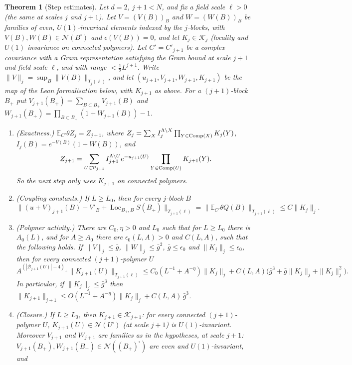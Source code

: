 \documentclass[11pt]{amsart}
\newtheorem{theorem}{Theorem}[section]
\theoremstyle{definition}
\theoremstyle{remark}
\numberwithin{equation}{section}
\newcommand{\E}{\mathbb{E}}
\newcommand{\cB}{\mathcal{B}}
\newcommand{\cP}{\mathcal{P}}
\newcommand{\cN}{\mathcal{N}}
\newcommand{\Loc}{\operatorname{Loc}}
\begin{document}
\begin{theorem}[Step estimates]\label{thm:step}
Let $d=2$, $j+1<N$, and fix a field scale $\ell>0$ (the same at scales $j$ and $j+1$). Let
$V=(V(B))_B$ and $W=(W(B))_B$ be families of even, $U(1)$-invariant elements indexed by the
$j$-blocks, with $V(B),W(B)\in\cN(B^\square)$ and $\epsilon(V(B))=0$, and let
$K_j\in\mathcal K_j$ (locality and $U(1)$ invariance on connected polymers). Let $C'=C'_{j+1}$
be a complex covariance with a Gram representation satisfying the Gram bound at scale $j+1$ and
field scale $\ell$, and with range $<\frac12L^{j+1}$. Write $\|V\|_j=\sup_B\|V(B)\|_{T_j(\ell)}$,
and let $(u_{j+1},V_{j+1},W_{j+1},K_{j+1})$ be the map of the Lean formalisation below, with
$K_{j+1}$ as above. For a $(j+1)$-block $B_+$ put
$V_{j+1}(B_+)=\sum_{B\subset B_+}V_{j+1}(B)$ and
$W_{j+1}(B_+)=\prod_{B\subset B_+}(1+W_{j+1}(B))-1$.
\begin{enumerate}
\item[(i)] (Exactness.) $\E_{C'}\theta Z_j=Z_{j+1}$, where
  $Z_j=\sum_XI_j^{\Lambda\setminus X}\prod_{Y\in{\rm Comp}(X)}K_j(Y)$,
  $I_j(B)=e^{-V(B)}(1+W(B))$, and
  \[
    Z_{j+1}=\sum_{U\in\cP_{j+1}}I_{j+1}^{\Lambda\setminus U}e^{-u_{j+1}(U)}
    \prod_{Y\in{\rm Comp}(U)}K_{j+1}(Y).
  \]
  So the next step only uses $K_{j+1}$ on connected polymers.
\item[(ii)] (Coupling constants.) If $L\ge L_0$, then for every $j$-block $B$
  \[
    \bigl\|(u+V)_{j+1}(B)-V'_B+\Loc_{B_+,B}S(B_+)\bigr\|_{T_{j+1}(\ell)}
    =\|\E_{C'}\theta Q(B)\|_{T_{j+1}(\ell)}\le C\|K_j\|_j .
  \]
\item[(iii)] (Polymer activity.) There are $C_0,\eta>0$ and $L_0$ such that for $L\ge L_0$
  there is $A_0(L)$, and for $A\ge A_0$ there are $\epsilon_0(L,A)>0$ and $C(L,A)$, such that
  the following holds. If $\|V\|_j\le\bar g$, $\|W\|_j\le\bar g^2$, $\bar g\le\epsilon_0$ and
  $\|K_j\|_j\le\epsilon_0$, then for every connected $(j+1)$-polymer $U$
  \[
    A^{(|\cB_{j+1}(U)|-4)_+}\|K_{j+1}(U)\|_{T_{j+1}(\ell)}\le
    C_0(L^{-1}+A^{-\eta})\|K_j\|_j+C(L,A)\bigl(\bar g^3+\bar g\|K_j\|_j+\|K_j\|_j^2\bigr).
  \]
  In particular, if $\|K_j\|_j\le\bar g^3$ then
  $\|K_{j+1}\|_{j+1}\le O(L^{-1}+A^{-\eta})\|K_j\|_j+C(L,A)\,\bar g^3$.
\item[(iv)] (Closure.) If $L\ge L_0$, then $K_{j+1}\in\mathcal K_{j+1}$: for every connected
  $(j+1)$-polymer $U$, $K_{j+1}(U)\in\cN(U^\square)$ (at scale $j+1$) is $U(1)$-invariant.
  Moreover $V_{j+1}$ and $W_{j+1}$ are families as in the hypotheses, at scale $j+1$:
  $V_{j+1}(B_+),W_{j+1}(B_+)\in\cN((B_+)^\square)$ are even and $U(1)$-invariant, and

\end{enumerate}
\end{theorem}
\end{document}
